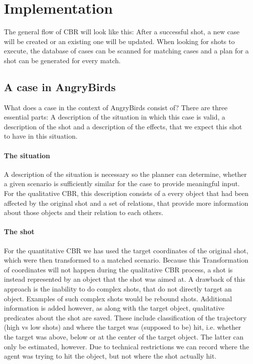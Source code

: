 \section{Implementation}\label{sec:implementation}

The general flow of CBR will look like this: After a successful shot, a new case will be created or an existing one will be updated. When looking for shots to execute, the database of cases can be scanned for matching cases and a plan for a shot can be generated for every match.


\subsection{A case in AngryBirds}\label{subsec:impl-case}
What does a case in the context of AngryBirds consist of? There are three essential parts: A description of the situation in which this case is valid, a description of the shot and a description of the effects, that we expect this shot to have in this situation.

\paragraph{The situation}
A description of the situation is necessary so the planner can determine, whether a given scenario is sufficiently similar for the case to provide meaningful input.
For the qualitative CBR, this description consists of a every object that had been affected by the original shot and a set of relations, that provide more information about those objects and their relation to each others.


\paragraph{The shot}
For the quantitative CBR we has used the target coordinates of the original shot, which were then transformed to a matched scenario.
Because this Transformation of coordinates will not happen during the qualitative CBR process, a shot is instead represented by an object that the shot was aimed at.
A drawback of this approach is the inability to do complex shots, that do not directly target an object.
Examples of such complex shots would be rebound shots.
Additional information is added however, as along with the target object, qualitative predicates about the shot are saved. These include classification of the trajectory (high vs low shots) and where the target was (supposed to be) hit, i.e. whether the target was above, below or at the center of the target object.
The latter can only be estimated, however. Due to technical restrictions we can record where the agent was trying to hit the object, but not where the shot actually hit.


